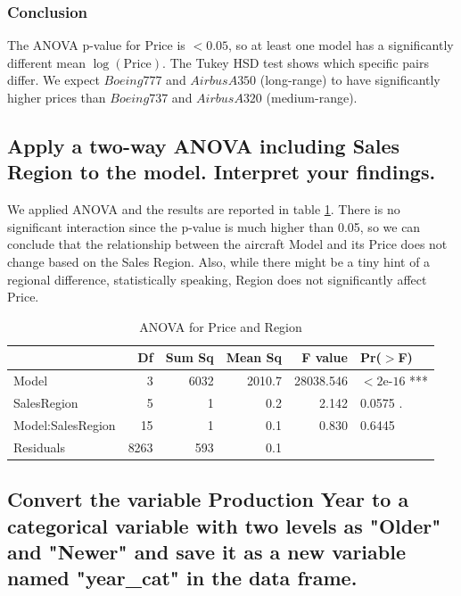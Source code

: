 \subsubsection*{Conclusion}
The ANOVA p-value for Price is $< 0.05$, so at least one model has a significantly different mean $\log(\text{Price})$. The Tukey HSD test shows which specific pairs differ. We expect $Boeing 777$ and $Airbus A350$ (long-range) to have significantly higher prices than $Boeing 737$ and $Airbus A320$ (medium-range). 

\subsection[Q2-c]{Apply a two-way ANOVA including Sales Region to the model. Interpret your findings.}

We applied ANOVA and the results are reported in table \ref{tab:05}. There is no significant interaction since the p-value is much higher than 0.05, so we can conclude that the relationship between the aircraft Model and its Price does not change based on the Sales Region. Also, while there might be a tiny hint of a regional difference, statistically speaking, Region does not significantly affect Price.

\begin{table}[htbp]
    \centering
    \begin{tabular}{l r r r r l}
        \hline
         & Df & Sum Sq & Mean Sq & F value & Pr($>$F) \\ 
        \hline
        Model             & 3    & 6032 & 2010.7 & 28038.546 & $< 2\text{e-}16$ *** \\
        SalesRegion       & 5    & 1    & 0.2    & 2.142     & 0.0575 . \\
        Model:SalesRegion & 15   & 1    & 0.1    & 0.830     & 0.6445 \\
        Residuals         & 8263 & 593  & 0.1    &           & \\ 
        \hline
    \end{tabular}
    \caption{ANOVA for Price and Region}
    \label{tab:05}
\end{table}

\subsection[Q2-d]{Convert the variable Production Year to a categorical variable with two levels as "Older" and "Newer" and save it as a new variable named "year\_cat" in the data frame.}

